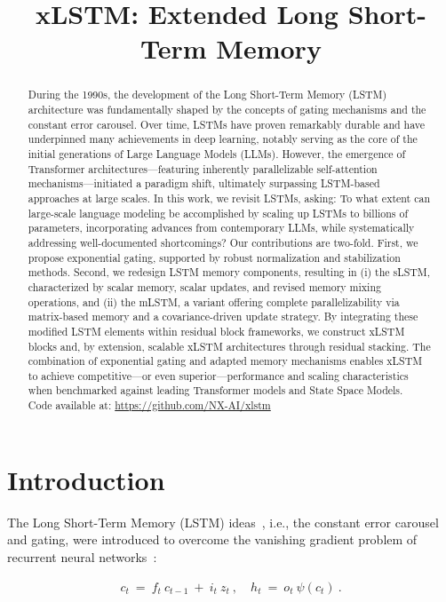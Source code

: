\title{xLSTM: Extended Long Short-Term Memory}

\begin{abstract}
During the 1990s, the development of the Long Short-Term Memory (LSTM) architecture was fundamentally shaped by the concepts of gating mechanisms and the constant error carousel. Over time, LSTMs have proven remarkably durable and have underpinned many achievements in deep learning, notably serving as the core of the initial generations of Large Language Models (LLMs). However, the emergence of Transformer architectures—featuring inherently parallelizable self-attention mechanisms—initiated a paradigm shift, ultimately surpassing LSTM-based approaches at large scales. In this work, we revisit LSTMs, asking: To what extent can large-scale language modeling be accomplished by scaling up LSTMs to billions of parameters, incorporating advances from contemporary LLMs, while systematically addressing well-documented shortcomings? Our contributions are two-fold. First, we propose exponential gating, supported by robust normalization and stabilization methods. Second, we redesign LSTM memory components, resulting in (i) the sLSTM, characterized by scalar memory, scalar updates, and revised memory mixing operations, and (ii) the mLSTM, a variant offering complete parallelizability via matrix-based memory and a covariance-driven update strategy. By integrating these modified LSTM elements within residual block frameworks, we construct xLSTM blocks and, by extension, scalable xLSTM architectures through residual stacking. The combination of exponential gating and adapted memory mechanisms enables xLSTM to achieve competitive—or even superior—performance and scaling characteristics when benchmarked against leading Transformer models and State Space Models.\\
Code available at: \url{https://github.com/NX-AI/xlstm}
\end{abstract}

\section{Introduction}
\label{sec:intro}

The Long Short-Term Memory (LSTM) ideas~\citep{Hochreiter:91,Hochreiter:97nips,Hochreiter:97}, i.e., the constant error carousel and gating, were introduced to overcome the vanishing gradient problem of recurrent neural networks~\citep{Hochreiter:91,Hochreiter:00book}:

\begin{align}
\label{eq:lstm_idea}
  c_t \ = \ f_t \ c_{t-1} \ + \ 
          i_t \  z_t \ , \quad  
          h_t \ = \ o_t \ \psi({c_t}) \ . 
\end{align}

